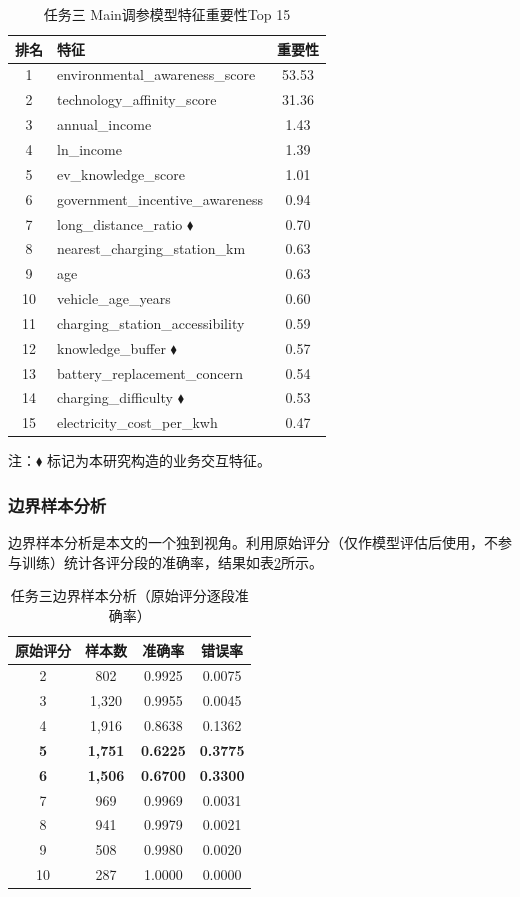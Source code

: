 \begin{table}[H]
\centering
\caption{任务三 Main调参模型特征重要性Top 15}
\label{tab:t3_import}
\begin{tabular}{clc}
\toprule
\textbf{排名} & \textbf{特征} & \textbf{重要性} \\
\midrule
1 & environmental\_awareness\_score & 53.53 \\
2 & technology\_affinity\_score & 31.36 \\
3 & annual\_income & 1.43 \\
4 & ln\_income & 1.39 \\
5 & ev\_knowledge\_score & 1.01 \\
6 & government\_incentive\_awareness & 0.94 \\
7 & long\_distance\_ratio $\blacklozenge$ & 0.70 \\
8 & nearest\_charging\_station\_km & 0.63 \\
9 & age & 0.63 \\
10 & vehicle\_age\_years & 0.60 \\
11 & charging\_station\_accessibility & 0.59 \\
12 & knowledge\_buffer $\blacklozenge$ & 0.57 \\
13 & battery\_replacement\_concern & 0.54 \\
14 & charging\_difficulty $\blacklozenge$ & 0.53 \\
15 & electricity\_cost\_per\_kwh & 0.47 \\
\bottomrule
\end{tabular}
\end{table}
注：$\blacklozenge$ 标记为本研究构造的业务交互特征。

\subsubsection{边界样本分析}

边界样本分析是本文的一个独到视角。利用原始评分（仅作模型评估后使用，不参与训练）统计各评分段的准确率，结果如表\ref{tab:t3_boundary}所示。

\begin{table}[H]
\centering
\caption{任务三边界样本分析（原始评分逐段准确率）}
\label{tab:t3_boundary}
\begin{tabular}{cccc}
\toprule
\textbf{原始评分} & \textbf{样本数} & \textbf{准确率} & \textbf{错误率} \\
\midrule
2 & 802 & 0.9925 & 0.0075 \\
3 & 1,320 & 0.9955 & 0.0045 \\
4 & 1,916 & 0.8638 & 0.1362 \\
\textbf{5} & \textbf{1,751} & \textbf{0.6225} & \textbf{0.3775} \\
\textbf{6} & \textbf{1,506} & \textbf{0.6700} & \textbf{0.3300} \\
7 & 969 & 0.9969 & 0.0031 \\
8 & 941 & 0.9979 & 0.0021 \\
9 & 508 & 0.9980 & 0.0020 \\
10 & 287 & 1.0000 & 0.0000 \\
\bottomrule
\end{tabular}
\end{table}

